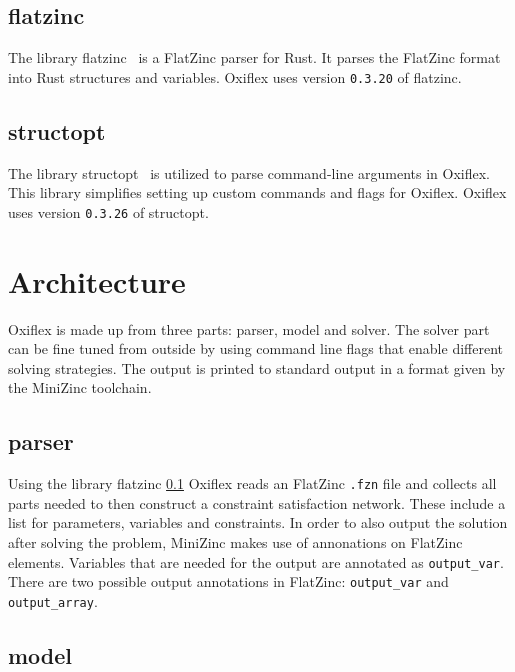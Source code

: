 \subsection{flatzinc} \label{flatzinc}

The library flatzinc~\cite{flatzinc:2020} is a FlatZinc parser for Rust. It parses the FlatZinc format into Rust structures and variables. Oxiflex uses version \verb|0.3.20| of flatzinc.

\subsection{structopt}

The library structopt~\cite{structopt:2020} is utilized to parse command-line arguments in Oxiflex. This library simplifies setting up custom commands and flags for Oxiflex. Oxiflex uses version \verb|0.3.26| of structopt.

\section{Architecture}

Oxiflex is made up from three parts: parser, model and solver. The solver part can be fine tuned from outside by using command line flags that enable different solving strategies. The output is printed to standard output in a format given by the MiniZinc toolchain.

\subsection{parser}

Using the library flatzinc \ref{flatzinc} Oxiflex reads an FlatZinc \verb|.fzn| file and collects all parts needed to then construct a constraint satisfaction network. These include a list for parameters, variables and constraints. In order to also output the solution after solving the problem, MiniZinc makes use of annonations on FlatZinc elements. Variables that are needed for the output are annotated as \verb|output_var|. There are two possible output annotations in FlatZinc: \verb|output_var| and \verb|output_array|.

\subsection{model} \label{model}

